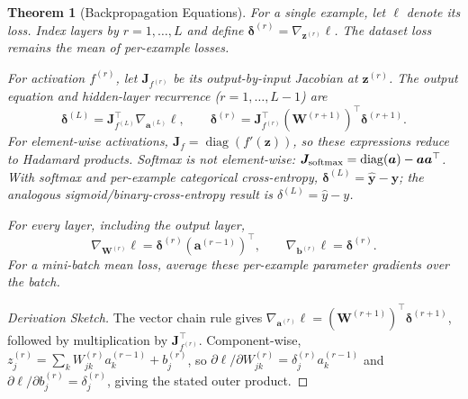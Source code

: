 \documentclass[11pt,twoside]{article}
\numberwithin{equation}{section}
\newcommand{\vect}[1]{\bm{#1}}
\newcommand{\mat}[1]{\bm{#1}}
\theoremstyle{plain}
\newtheorem{theorem}{Theorem}[section]
\theoremstyle{definition}
\theoremstyle{remark}
\begin{document}
\begin{theorem}[Backpropagation Equations]
For a single example, let $\ell$ denote its loss. Index layers by $r=1,\ldots,L$ and define $\boldsymbol{\delta}^{(r)}=\nabla_{\vect{z}^{(r)}}\ell$. The dataset loss remains the mean of per-example losses.

For activation $f^{(r)}$, let $\mat{J}_{f^{(r)}}$ be its output-by-input Jacobian at $\vect{z}^{(r)}$. The output equation and hidden-layer recurrence ($r=1,\ldots,L-1$) are
\[
\boldsymbol{\delta}^{(L)}=\mat{J}_{f^{(L)}}^\top\nabla_{\vect{a}^{(L)}}\ell,
\qquad
\boldsymbol{\delta}^{(r)}=\mat{J}_{f^{(r)}}^\top
(\vect{W}^{(r+1)})^\top\boldsymbol{\delta}^{(r+1)}.
\]
For element-wise activations, $\mat{J}_f=\operatorname{diag}(f'(\vect{z}))$, so these expressions reduce to Hadamard products. Softmax is not element-wise: $\mat{J}_{\rm softmax}=\operatorname{diag}(\vect{a})-\vect{a}\vect{a}^\top$. With softmax and per-example categorical cross-entropy, $\boldsymbol{\delta}^{(L)}=\hat{\vect{y}}-\vect{y}$; the analogous sigmoid/binary-cross-entropy result is $\delta^{(L)}=\hat y-y$.

For every layer, including the output layer,
\[
\nabla_{\vect{W}^{(r)}}\ell=\boldsymbol{\delta}^{(r)}(\vect{a}^{(r-1)})^\top,
\qquad \nabla_{\vect{b}^{(r)}}\ell=\boldsymbol{\delta}^{(r)}.
\]
For a mini-batch mean loss, average these per-example parameter gradients over the batch.
\end{theorem}

\begin{proof}[Derivation Sketch]
The vector chain rule gives $\nabla_{\vect{a}^{(r)}}\ell=(\vect{W}^{(r+1)})^\top\boldsymbol{\delta}^{(r+1)}$, followed by multiplication by $\mat{J}_{f^{(r)}}^\top$. Component-wise, $z_j^{(r)}=\sum_k W_{jk}^{(r)}a_k^{(r-1)}+b_j^{(r)}$, so $\partial\ell/\partial W_{jk}^{(r)}=\delta_j^{(r)}a_k^{(r-1)}$ and $\partial\ell/\partial b_j^{(r)}=\delta_j^{(r)}$, giving the stated outer product.
\end{proof}
\end{document}
